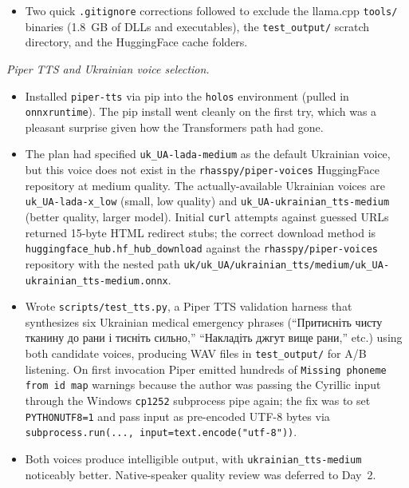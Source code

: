 \documentclass{article}
\theoremstyle{plain}
\theoremstyle{definition}
\theoremstyle{remark}
\begin{document}
\begin{itemize}
\item Two quick \texttt{.gitignore} corrections followed to exclude the llama.cpp \texttt{tools/} binaries (1.8~GB of DLLs and executables), the \texttt{test\_output/} scratch directory, and the HuggingFace cache folders.
\end{itemize}

\textit{Piper TTS and Ukrainian voice selection.}
\begin{itemize}
\item Installed \texttt{piper-tts} via pip into the \texttt{holos} environment (pulled in \texttt{onnxruntime}). The pip install went cleanly on the first try, which was a pleasant surprise given how the Transformers path had gone.
\item The plan had specified \texttt{uk\_UA-lada-medium} as the default Ukrainian voice, but this voice does not exist in the \texttt{rhasspy/piper-voices} HuggingFace repository at medium quality. The actually-available Ukrainian voices are \texttt{uk\_UA-lada-x\_low} (small, low quality) and \texttt{uk\_UA-ukrainian\_tts-medium} (better quality, larger model). Initial \texttt{curl} attempts against guessed URLs returned 15-byte HTML redirect stubs; the correct download method is \texttt{huggingface\_hub.hf\_hub\_download} against the \texttt{rhasspy/piper-voices} repository with the nested path \texttt{uk/uk\_UA/ukrainian\_tts/medium/uk\_UA-ukrainian\_tts-medium.onnx}.
\item Wrote \texttt{scripts/test\_tts.py}, a Piper TTS validation harness that synthesizes six Ukrainian medical emergency phrases (``Притисніть чисту тканину до рани і тисніть сильно,'' ``Накладіть джгут вище рани,'' etc.) using both candidate voices, producing WAV files in \texttt{test\_output/} for A/B listening. On first invocation Piper emitted hundreds of \texttt{Missing phoneme from id map} warnings because the author was passing the Cyrillic input through the Windows \texttt{cp1252} subprocess pipe again; the fix was to set \texttt{PYTHONUTF8=1} and pass input as pre-encoded UTF-8 bytes via \texttt{subprocess.run(..., input=text.encode("utf-8"))}.
\item Both voices produce intelligible output, with \texttt{ukrainian\_tts-medium} noticeably better. Native-speaker quality review was deferred to Day~2.
\end{itemize}
\end{document}
